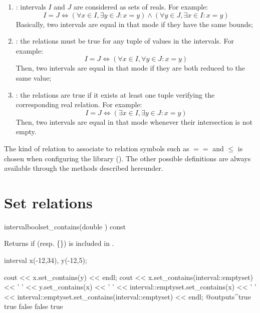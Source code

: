 \documentclass{manual}
\let\leq=\leqslant
\begin{document}
\begin{enumerate}
\item{}: intervals $I$ and $J$ are considered as sets of reals. For example:
\begin{equation*}
I=J \Leftrightarrow(\forall x\in I, \exists y\in J\colon x=y)\wedge
                   (\forall y\in J, \exists x\in I\colon x=y)
\end{equation*}
Basically, two intervals are equal in that mode if they have the same bounds;
\item{}: the relations must be true for any tuple of
values in the intervals. For example:
\begin{equation*}
I=J \Leftrightarrow(\forall x\in I, \forall y\in J\colon x=y)
\end{equation*}
Then, two intervals are equal in that mode if they are both reduced to
the same value;
\item{}: the relations are true if it exists at
least one tuple verifying the corresponding real relation. For example:
\begin{equation*}
I=J \Leftrightarrow(\exists x\in I, \exists y\in J\colon x=y)
\end{equation*}
Then, two intervals are equal in that mode whenever their intersection
is not empty.
\end{enumerate}

The kind of relation to associate to relation symbols such as
$==$ and $\leq$ is chosen when configuring the library ().
The other possible definitions are always available through the methods
described hereunder.

\section{Set relations}

\begin{defmethod}{interval}{bool}{set\_contains}{(double ) const}
  \begin{operation}
  \end{operation}
  Returns  if  (resp. \{\}) is included in .

\begin{example}
interval x(-12,34), y(-12,5);

cout << x.set_contains(y) << endl;
cout << x.set_contains(interval::emptyset) << ' '
     << y.set_contains(x) << ' '
     << interval::emptyset.set_contains(x) << ' '
     << interval::emptyset.set_contains(interval::emptyset)
     << endl;
@outputs^true true false false true~
\end{example}
\end{defmethod}
\end{document}
